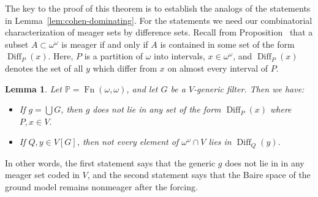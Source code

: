 \documentclass[11pt,oneside]{amsbook}
\newcommand{\PP}{\mathbb P}
\DeclareMathOperator{\Diff}{Diff}
\DeclareMathOperator{\Fn}{Fn}
\theoremstyle{definition}
\theoremstyle{plain}
\newtheorem{lem}[thm]{Lemma}
\theoremstyle{definition}
\theoremstyle{remark}
\begin{document}
The key to the proof of this theorem is to establish the analogs of the statements in Lemma~\ref{lem:cohen-dominating}. For the statements we need our combinatorial characterization of meager sets by difference sets. Recall from Proposition~\label{prop:meager-diff} that a subset $A\subset\omega^\omega$ is meager if and only if $A$ is contained in some set of the form $\Diff_P(x)$. Here, $P$ is a partition of $\omega$ into intervals, $x\in\omega^\omega$, and $\Diff_P(x)$ denotes the set of all $y$ which differ from $x$ on almost every interval of $P$.

\begin{lem}
  \label{lem:cohen-meager}
  Let $\PP=\Fn(\omega,\omega)$, and let $G$ be a $V$-generic filter. Then we have:
  \begin{itemize}
  \item If $g=\bigcup G$, then $g$ does not lie in any set of the form $\Diff_P(x)$ where $P,x\in V$.
  \item If $Q,y\in V[G]$, then not every element of $\omega^\omega\cap V$ lies in $\Diff_Q(y)$.
  \end{itemize}
\end{lem}

In other words, the first statement says that the generic $g$ does not lie in in any meager set coded in $V$, and the second statement says that the Baire space of the ground model remains nonmeager after the forcing.
\end{document}
